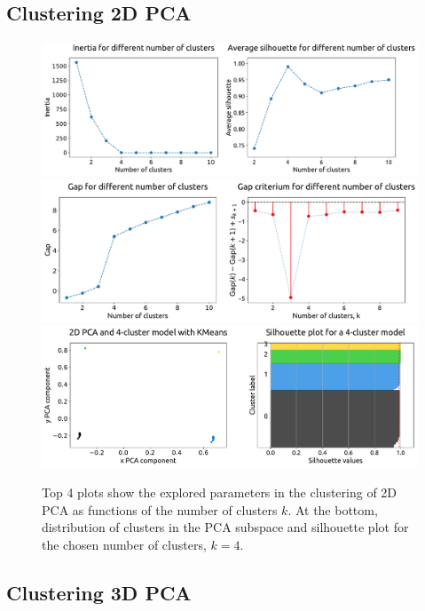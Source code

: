 \documentclass[12pt,a4paper]{article}
\begin{document}
\clearpage

\subsection{Clustering 2D PCA}

\begin{figure}[ht!]
\centering
\includegraphics[width=\textwidth]{figs/PCA_2D_parfigs_1.pdf}
\includegraphics[width=\textwidth]{figs/PCA_2D_parfigs_2.pdf}
\includegraphics[width=\textwidth]{figs/PCA_2D_clusfigs_4_cluster.pdf}
\caption{Top 4 plots show the explored parameters in the clustering of 2D PCA as functions of the number of clusters $k$. At the bottom, distribution of clusters in the PCA subspace and silhouette plot for the chosen number of clusters, $k = 4$.}
\label{PCA_2D_parfigs}
\end{figure}

\clearpage

\subsection{Clustering 3D PCA}
\end{document}
